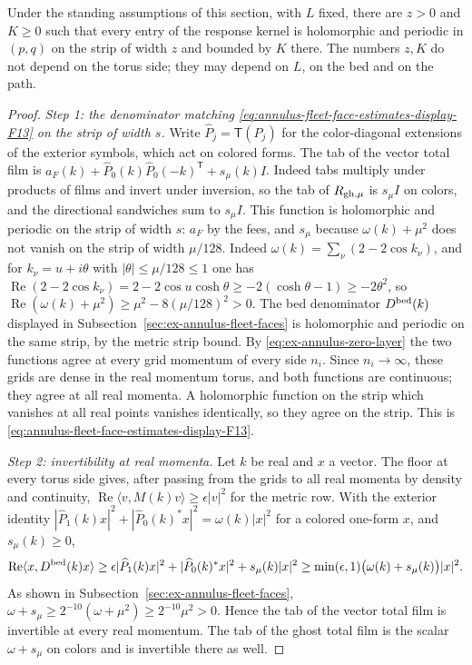 \begin{lemma}
\label{lem:ex-annulus-common-strip}
Under the standing assumptions of this section, with $L$ fixed, there
are $z>0$ and $K\geq0$ such that every entry of the response kernel is
holomorphic and periodic in $(p,q)$ on the strip of width $z$ and
bounded by $K$ there. The numbers $z,K$ do not depend on the torus
side; they may depend on $L$, on the bed and on the path.
\end{lemma}
\begin{proof}
\emph{Step 1: the denominator matching \eqref{eq:annulus-fleet-face-estimates-display-F13} on the strip of width
$s$.} Write $\widehat P_j=\mathsf T(P_j)$ for the color-diagonal
extensions of the exterior symbols, which act on colored forms. The
tab of the vector total film is
$a_F(k)+\widehat P_0(k)\widehat P_0(-k)^{\mathsf T}+s_\mu(k)I$. Indeed
tabs multiply
under products of films and invert under inversion, so the tab of
$R_{{\rm gh},\mu}$ is $s_\mu I$ on colors, and the directional
sandwiches sum to $s_\mu I$. This function is holomorphic and periodic
on the strip of width $s$: $a_F$ by the fees, and $s_\mu$ because
$\omega(k)+\mu^2$ does not vanish on the strip of width $\mu/128$.
Indeed $\omega(k)=\sum_\nu(2-2\cos k_\nu)$, and for
$k_\nu=u+i\theta$ with $|\theta|\leq\mu/128\leq1$ one has
$\operatorname{Re}(2-2\cos k_\nu)=2-2\cos u\cosh\theta
\geq-2(\cosh\theta-1)\geq-2\theta^2$, so
$\operatorname{Re}(\omega(k)+\mu^2)\geq\mu^2-8(\mu/128)^2>0$. The
bed denominator $D^{\rm bed}(k)$ displayed in
Subsection~\ref{sec:ex-annulus-fleet-faces} is holomorphic and periodic on
the same strip, by the metric strip bound. By
\eqref{eq:ex-annulus-zero-layer} the two functions agree at every grid
momentum of every side $n_i$. Since $n_i\to\infty$, these grids are
dense in the real momentum torus, and both functions are continuous;
they agree at all real momenta. A holomorphic function on the strip
which vanishes at all real points vanishes identically, so they agree on
the strip. This is \eqref{eq:annulus-fleet-face-estimates-display-F13}.

\emph{Step 2: invertibility at real momenta.} Let $k$ be real and $x$ a
vector. The floor at every torus side gives, after passing from the
grids to all real momenta by density and continuity,
$\operatorname{Re}\langle v,M(k)v\rangle\geq\epsilon|v|^2$ for the
metric row. With the
exterior identity
$|\widehat P_1(k)x|^2+|\widehat P_0(k)^*x|^2=\omega(k)|x|^2$ for a
colored one-form $x$, and $s_\mu(k)\geq0$,
\[
 \operatorname{Re}\langle x,D^{\rm bed}(k)x\rangle
 \geq\epsilon|\widehat P_1(k)x|^2+|\widehat P_0(k)^*x|^2
      +s_\mu(k)|x|^2
 \geq\min(\epsilon,1)\bigl(\omega(k)+s_\mu(k)\bigr)|x|^2 .
\]
As shown in Subsection~\ref{sec:ex-annulus-fleet-faces},
$\omega+s_\mu\geq2^{-10}(\omega+\mu^2)\geq2^{-10}\mu^2>0$. Hence the
tab of the vector total film is invertible at every real momentum. The
tab of the ghost total film is the scalar $\omega+s_\mu$ on colors and
is invertible there as well.


\end{proof}
